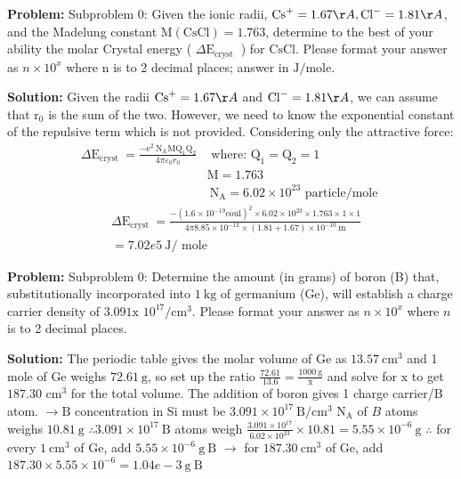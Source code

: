 \documentclass[10pt]{article}
\begin{document}
\textbf{Problem:}
Subproblem 0: Given the ionic radii, $\mathrm{Cs}^{+}=1.67 \AA, \mathrm{Cl}^{-}=1.81 \AA$, and the Madelung constant $\mathrm{M}(\mathrm{CsCl})=1.763$, determine to the best of your ability the molar Crystal energy ( $\Delta \mathrm{E}_{\text {cryst }}$ ) for $\mathrm{CsCl}$. Please format your answer as $n \times 10^x$ where n is to 2 decimal places; answer in $\mathrm{J} / \text{mole}$. 


\textbf{Solution:}
Given the radii $\mathrm{Cs}^{+}=1.67 \AA$ and $\mathrm{Cl}^{-}=1.81 \AA$, we can assume that $\mathrm{r}_{0}$ is the sum of the two. However, we need to know the exponential constant of the repulsive term which is not provided. Considering only the attractive force:
\[
\begin{array}{ll}
\Delta \mathrm{E}_{\text {cryst }}=\frac{-\mathrm{e}^{2} \mathrm{~N}_{\mathrm{A}} \mathrm{MQ}_{1} \mathrm{Q}_{2}}{4 \pi \varepsilon_{0} r_{0}} & \text { where: } \mathrm{Q}_{1}=\mathrm{Q}_{2}=1 \\
& \mathrm{M}=1.763 \\
& \mathrm{~N}_{\mathrm{A}}=6.02 \times 10^{23} \text { particle/mole }
\end{array}
\]
\[
\begin{aligned}
& \Delta \mathrm{E}_{\text {cryst }}=\frac{-\left(1.6 \times 10^{-19} \mathrm{coul}\right)^{2} \times 6.02 \times 10^{23} \times 1.763 \times 1 \times 1}{4 \pi 8.85 \times 10^{-12} \times(1.81+1.67) \times 10^{-10} \mathrm{~m}} \\
& = \boxed{7.02e5} \mathrm{~J} / \text { mole }
\end{aligned}
\]


\textbf{Problem:}
Subproblem 0: Determine the amount (in grams) of boron (B) that, substitutionally incorporated into $1 \mathrm{~kg}$ of germanium (Ge), will establish a charge carrier density of $3.091 \mathrm{x}$ $10^{17} / \mathrm{cm}^{3}$. Please format your answer as $n \times 10^x$ where $n$ is to 2 decimal places. 


\textbf{Solution:}
The periodic table gives the molar volume of Ge as $13.57 \mathrm{~cm}^{3}$ and 1 mole of Ge weighs $72.61 \mathrm{~g}$, so set up the ratio $\frac{72.61}{13.6}=\frac{1000 \mathrm{~g}}{\mathrm{x}}$ and solve for $\mathrm{x}$ to get $187.30$ $\mathrm{cm}^{3}$ for the total volume. The addition of boron gives 1 charge carrier/B atom.
$\rightarrow \mathrm{B}$ concentration in Si must be $3.091 \times 10^{17} \mathrm{~B} / \mathrm{cm}^{3}$
$\mathrm{N}_{\mathrm{A}}$ of $B$ atoms weighs $10.81 \mathrm{~g}$
$\therefore 3.091 \times 10^{17} \mathrm{~B}$ atoms weigh $\frac{3.091 \times 10^{17}}{6.02 \times 10^{23}} \times 10.81=5.55 \times 10^{-6} \mathrm{~g}$
$\therefore$ for every $1 \mathrm{~cm}^{3}$ of Ge, add $5.55 \times 10^{-6} \mathrm{~g} \mathrm{~B}$
$\rightarrow$ for $187.30 \mathrm{~cm}^{3}$ of Ge, add $187.30 \times 5.55 \times 10^{-6}= \boxed{1.04e-3} \mathrm{~g} \mathrm{~B}$
\end{document}
